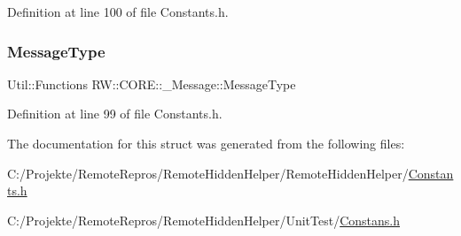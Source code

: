Definition at line 100 of file Constants.\+h.

\hypertarget{struct_r_w_1_1_c_o_r_e_1_1___message_abc67122c243af657f68760c56fa5f8a6}{}\label{struct_r_w_1_1_c_o_r_e_1_1___message_abc67122c243af657f68760c56fa5f8a6} 
\subsubsection{\texorpdfstring{Message\+Type}{MessageType}}
{\footnotesize\ttfamily Util\+::\+Functions R\+W\+::\+C\+O\+R\+E\+::\+\_\+\+Message\+::\+Message\+Type}



Definition at line 99 of file Constants.\+h.



The documentation for this struct was generated from the following files\+:\begin{DoxyCompactItemize}
\item 
C\+:/\+Projekte/\+Remote\+Repros/\+Remote\+Hidden\+Helper/\+Remote\+Hidden\+Helper/\hyperlink{_constants_8h}{Constants.\+h}\item 
C\+:/\+Projekte/\+Remote\+Repros/\+Remote\+Hidden\+Helper/\+Unit\+Test/\hyperlink{_constans_8h}{Constans.\+h}\end{DoxyCompactItemize}
